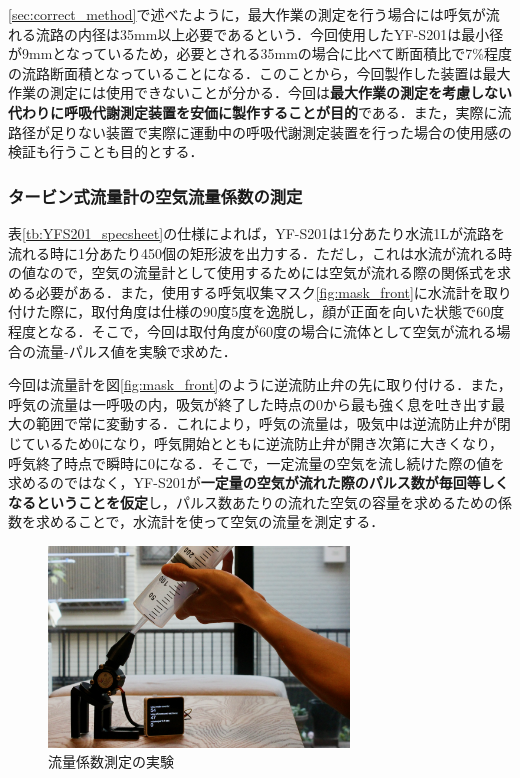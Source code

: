 \ref{sec:correct_method}で述べたように，最大作業の測定を行う場合には呼気が流れる流路の内径は35mm以上必要であるという．今回使用したYF-S201は最小径が9mmとなっているため，必要とされる35mmの場合に比べて断面積比で7\%程度の流路断面積となっていることになる．このことから，今回製作した装置は最大作業の測定には使用できないことが分かる．今回は{\bf 最大作業の測定を考慮しない代わりに呼吸代謝測定装置を安価に製作することが目的}である．また，実際に流路径が足りない装置で実際に運動中の呼吸代謝測定装置を行った場合の使用感の検証も行うことも目的とする．

\subsubsection{タービン式流量計の空気流量係数の測定}
\label{sec:measuring_coefficient}

表\ref{tb:YFS201_specsheet}の仕様によれば，YF-S201は1分あたり水流1Lが流路を流れる時に1分あたり450個の矩形波を出力する．ただし，これは水流が流れる時の値なので，空気の流量計として使用するためには空気が流れる際の関係式を求める必要がある．また，使用する呼気収集マスク\ref{fig:mask_front}に水流計を取り付けた際に，取付角度は仕様の90度\pm5度を逸脱し，顔が正面を向いた状態で60度程度となる．そこで，今回は取付角度が60度の場合に流体として空気が流れる場合の流量-パルス値を実験で求めた．

今回は流量計を図\ref{fig:mask_front}のように逆流防止弁の先に取り付ける．また，呼気の流量は一呼吸の内，吸気が終了した時点の0から最も強く息を吐き出す最大の範囲で常に変動する．これにより，呼気の流量は，吸気中は逆流防止弁が閉じているため0になり，呼気開始とともに逆流防止弁が開き次第に大きくなり，呼気終了時点で瞬時に0になる．そこで，一定流量の空気を流し続けた際の値を求めるのではなく，YF-S201が{\bf 一定量の空気が流れた際のパルス数が毎回等しくなるということを仮定}し，パルス数あたりの流れた空気の容量を求めるための係数を求めることで，水流計を使って空気の流量を測定する．

\begin{figure}[H]
  \begin{center}
    \includegraphics[width=8cm]{fig/flowsensor_calibrate}
    \caption{流量係数測定の実験}
    \label{fig:flowsensor_calibrate}
  \end{center}
\end{figure}

